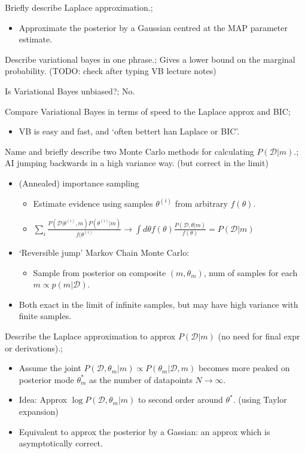 \documentclass{article}
\begin{document}
Briefly describe Laplace approximation.; \begin{itemize} \item Approximate the posterior by a Gaussian centred at the MAP parameter estimate.  \end{itemize}

Describe variational bayes in one phrase.; Gives a lower bound on the marginal probability. (TODO: check after typing VB lecture notes)

Is Variational Bayes unbiased?; No.

Compare Variational Bayes in terms of speed to the Laplace approx and BIC; \begin{itemize} \item VB is easy and fast, and `often bettert han Laplace or BIC'.  \end{itemize}

Name and briefly describe two Monte Carlo methods for calculating $P(\mathcal{D}|m)$.; AI jumping backwards in a high variance way. (but correct in the limit) \begin{itemize} \item (Annealed) importance sampling \begin{itemize} \item Estimate evidence using samples $\theta^{(i)}$ from arbitrary $f(\theta)$.  \item $\sum_i \frac{P(\mathcal{D}|\theta^{(i)}, m)P(\theta^{(i)}|m)}{f(\theta^{(i)}}\rightarrow \int d\theta f(\theta)\frac{P(\mathcal{D},\theta|m)}{f(\theta)}=P(\mathcal{D}|m)$ \end{itemize} \item `Reversible jump' Markov Chain Monte Carlo: \begin{itemize} \item Sample from posterior on composite $(m, \theta_m)$, num of samples for each $m\propto p(m|\mathcal{D})$.  \end{itemize} \item Both exact in the limit of infinite samples, but may have high variance with finite samples.  \end{itemize}

Describe the Laplace approximation to approx $P(\mathcal{D}|m)$ (no need for final expr or derivations).; \begin{itemize} \item Assume the joint $P(\mathcal{D},\theta_m|m)\propto P(\theta_m|\mathcal{D},m)$ becomes more peaked on posterior mode $\theta^*_m$ as the number of datapoints $N\rightarrow\infty$.  \item Idea: Approx $\log P(\mathcal{D},\theta_m|m)$ to second order around $\theta^*$. (using Taylor expansion) \item Equivalent to approx the posterior by a Gassian: an approx which is asymptotically correct.  \end{itemize}
\end{document}
